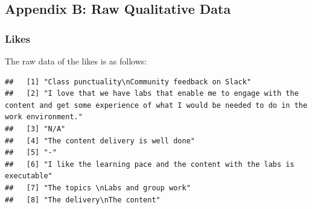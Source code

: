 \documentclass[
]{article}
\begin{document}
\newpage

\subsection{Appendix B: Raw Qualitative
Data}\label{appendix-b-raw-qualitative-data}

\subsubsection{Likes}\label{likes}

The raw data of the likes is as follows:

\begin{verbatim}
##   [1] "Class punctuality\nCommunity feedback on Slack"                                                                                                                                                                                                   
##   [2] "I love that we have labs that enable me to engage with the content and get some experience of what I would be needed to do in the work environment."                                                                                              
##   [3] "N/A"                                                                                                                                                                                                                                              
##   [4] "The content delivery is well done"                                                                                                                                                                                                                
##   [5] "-"                                                                                                                                                                                                                                                
##   [6] "I like the learning pace and the content with the labs is executable"                                                                                                                                                                             
##   [7] "The topics \nLabs and group work"                                                                                                                                                                                                                 
##   [8] "The delivery\nThe content"                                                                                                                                                                                                                        

\end{verbatim}
\end{document}
